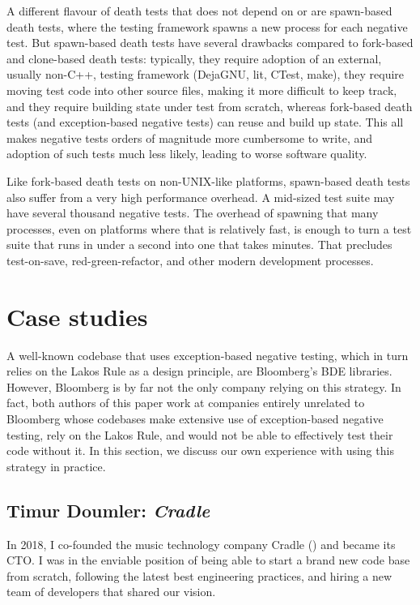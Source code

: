A different flavour of death tests that does not depend on  or  are spawn-based death tests, where the testing framework spawns a new process for each negative test. But spawn-based death tests have several drawbacks compared to fork-based and clone-based death tests: typically, they require adoption of an external, usually non-C++, testing framework (DejaGNU, lit, CTest, make), they require moving test code into other source files, making it more difficult to keep track, and they require building state under test from scratch, whereas fork-based death tests (and exception-based negative tests) can reuse and build up state. This all makes negative tests orders of magnitude more cumbersome to write, and adoption of such tests much less likely, leading to worse software quality.

Like fork-based death tests on non-UNIX-like platforms, spawn-based death tests also suffer from a very high performance overhead. A mid-sized test suite may have several thousand negative tests. The overhead of spawning that many processes, even on platforms where that is relatively fast, is enough to turn a test suite that runs in under a second into one that takes minutes. That precludes test-on-save, red-green-refactor, and other modern development processes.

\section{Case studies}
\label{sec:casestudies}

A well-known codebase that uses exception-based negative testing, which in turn relies on the Lakos Rule as a design principle, are Bloomberg's BDE libraries. However, Bloomberg is by far not the only company relying on this strategy. In fact, both authors of this paper work at companies entirely unrelated to Bloomberg whose codebases make extensive use of exception-based negative testing, rely on the Lakos Rule, and would not be able to effectively test their code without it. In this section, we discuss our own experience with using this strategy in practice.

\subsection{Timur Doumler: \emph{Cradle}}

In 2018, I co-founded the music technology company Cradle (\hyperref[https://cradle.app]{}) and became its CTO. I was in the enviable position of being able to start a brand new code base from scratch, following the latest best engineering practices, and hiring a new team of developers that shared our vision.

